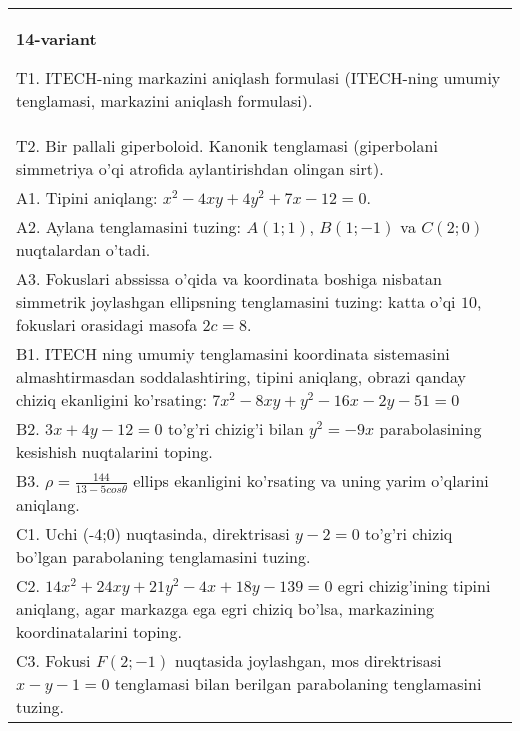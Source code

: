 \documentclass{article}
\begin{document}
\begin{tabular}{m{17cm}}
\textbf{14-variant}
\newline

T1. ITECH-ning markazini aniqlash formulasi (ITECH-ning umumiy tenglamasi, markazini aniqlash formulasi).\\

T2. Bir pallali giperboloid. Kanonik tenglamasi (giperbolani simmetriya o'qi atrofida aylantirishdan olingan sirt).\\

A1. Tipini aniqlang: $x^{2}-4xy+4y^{2}+7x-12=0$.\\

A2. Aylana tenglamasini tuzing: $A(1;1)$, $B(1;-1)$ va $C(2;0)$ nuqtalardan o'tadi.\\

A3. Fokuslari abssissa o'qida va koordinata boshiga nisbatan simmetrik joylashgan ellipsning tenglamasini tuzing: katta o'qi $10$, fokuslari orasidagi masofa $2c=8$.\\

B1. ITECH ning umumiy tenglamasini koordinata sistemasini almashtirmasdan soddalashtiring, tipini aniqlang, obrazi qanday chiziq ekanligini ko'rsating: $7x^{2} - 8xy + y^{2} - 16x - 2y - 51 = 0$\\

B2. $3x + 4y - 12 = 0$ to'g'ri chizig'i bilan $y^{2} = - 9x$ parabolasining kesishish nuqtalarini toping.  \\

B3. $\rho = \frac{144}{13 - 5cos\theta}$ ellips ekanligini ko'rsating va uning yarim o'qlarini aniqlang.\\

C1. Uchi (-4;0) nuqtasinda, direktrisasi $y - 2 = 0$ to'g'ri chiziq bo'lgan parabolaning tenglamasini tuzing.\\

C2. $14x^{2} + 24xy + 21y^{2} - 4x + 18y - 139 = 0$ egri chizig'ining tipini aniqlang, agar markazga ega egri chiziq bo'lsa, markazining koordinatalarini toping.  \\

C3. Fokusi $F(2; - 1)$ nuqtasida joylashgan, mos direktrisasi $x - y - 1 = 0$ tenglamasi bilan berilgan parabolaning tenglamasini tuzing.  \\

\end{tabular}
\vspace{1cm}
\end{document}
